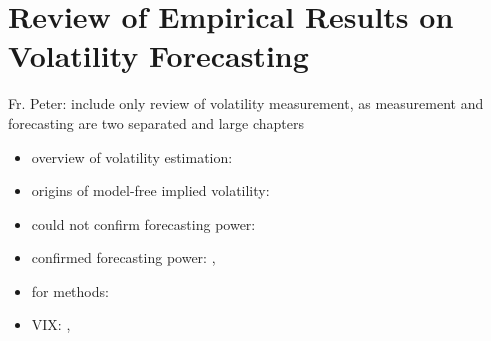 
\section{Review of Empirical Results on Volatility Forecasting}
Fr. Peter: include only review of volatility measurement, as measurement and forecasting are two separated and large chapters
\begin{itemize}\itemsep0pt
\item overview of volatility estimation: \citeauthor{poon2003}
\item origins of model-free implied volatility: \citeauthor{britten2000}
\item could not confirm forecasting power: 
\item confirmed forecasting power: \citeauthor{jiang2003}, \citeauthor{bakanova2010}
\item for methods: \citeauthor{corsi2009}
\item VIX: \citeauthor{whaley2008}, \citeauthor{exchange2009}
\end{itemize}



